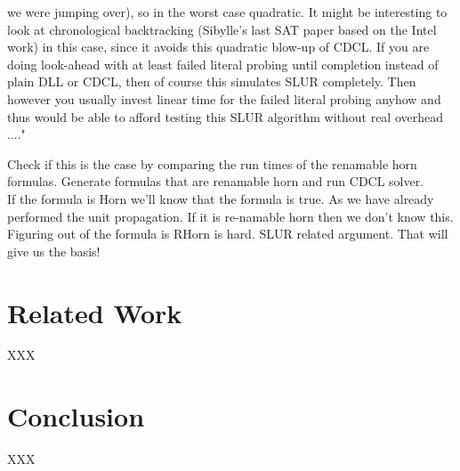 \documentclass[runningheads]{llncs}
\begin{document}
 we were jumping over), so in the worst case quadratic.  It might be interesting to look at chronological backtracking (Sibylle's last SAT paper based on the Intel work) in this case, since it avoids this quadratic blow-up of CDCL. If you are doing look-ahead with at least failed literal probing until completion instead of plain DLL or CDCL, then
 of course this simulates SLUR completely.  Then however you usually invest linear time for the failed literal probing anyhow and thus would be able to afford testing this SLUR algorithm without real overhead ...."

Check if this is the case by comparing the run times of the renamable horn formulas. Generate formulas that are renamable horn and run CDCL solver.\\

If the formula is Horn we'll know that the formula is true. As we have already performed the unit propagation. If it is re-namable horn then we don't know this. Figuring out of the formula is RHorn is hard. SLUR related argument. That will give us the basis! \\ 

\section{Related Work} \label{sec:relatedwork}
XXX

\section{Conclusion} \label{sec:conclusion}
XXX

%
%

 
 
\end{document}
